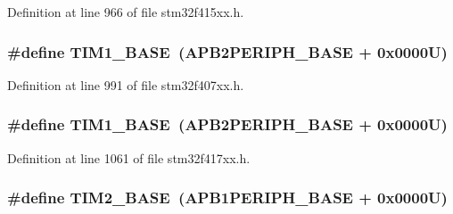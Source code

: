 Definition at line 966 of file stm32f415xx.\+h.

\subsubsection[{\texorpdfstring{T\+I\+M1\+\_\+\+B\+A\+SE}{TIM1_BASE}}]{\setlength{\rightskip}{0pt plus 5cm}\#define T\+I\+M1\+\_\+\+B\+A\+SE~({\bf A\+P\+B2\+P\+E\+R\+I\+P\+H\+\_\+\+B\+A\+SE} + 0x0000\+U)}\hypertarget{group___peripheral__registers__structures_gaf8aa324ca5011b8173ab16585ed7324a}{}\label{group___peripheral__registers__structures_gaf8aa324ca5011b8173ab16585ed7324a}


Definition at line 991 of file stm32f407xx.\+h.

\subsubsection[{\texorpdfstring{T\+I\+M1\+\_\+\+B\+A\+SE}{TIM1_BASE}}]{\setlength{\rightskip}{0pt plus 5cm}\#define T\+I\+M1\+\_\+\+B\+A\+SE~({\bf A\+P\+B2\+P\+E\+R\+I\+P\+H\+\_\+\+B\+A\+SE} + 0x0000\+U)}\hypertarget{group___peripheral__registers__structures_gaf8aa324ca5011b8173ab16585ed7324a}{}\label{group___peripheral__registers__structures_gaf8aa324ca5011b8173ab16585ed7324a}


Definition at line 1061 of file stm32f417xx.\+h.

\subsubsection[{\texorpdfstring{T\+I\+M2\+\_\+\+B\+A\+SE}{TIM2_BASE}}]{\setlength{\rightskip}{0pt plus 5cm}\#define T\+I\+M2\+\_\+\+B\+A\+SE~({\bf A\+P\+B1\+P\+E\+R\+I\+P\+H\+\_\+\+B\+A\+SE} + 0x0000\+U)}\hypertarget{group___peripheral__registers__structures_ga00d0fe6ad532ab32f0f81cafca8d3aa5}{}\label{group___peripheral__registers__structures_ga00d0fe6ad532ab32f0f81cafca8d3aa5}


